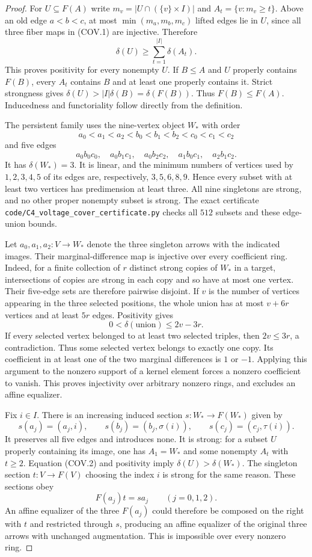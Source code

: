 \begin{proof}
For $U\subseteq F(A)$ write
$m_v=|U\cap(\{v\}\times I)|$ and
$A_t=\{v:m_v\geq t\}$. Above an old edge $a<b<c$, at
most $\min(m_a,m_b,m_c)$ lifted edges lie in $U$, since
all three fiber maps in (COV.1) are injective. Therefore
\[
 \delta(U)\geq \sum_{t=1}^{|I|}\delta(A_t).
 \tag{COV.2}
\]
This proves positivity for every nonempty $U$. If
$B\leq A$ and $U$ properly contains $F(B)$, every $A_t$
contains $B$ and at least one properly contains it.
Strict strongness gives
$\delta(U)>|I|\delta(B)=\delta(F(B))$.
Thus $F(B)\leq F(A)$. Inducedness and functoriality follow
directly from the definition.

The persistent family uses the nine-vertex object $W_*$
with order
\[
 a_0<a_1<a_2<b_0<b_1<b_2<c_0<c_1<c_2
\]
and five edges
\[
 a_0b_0c_0,\quad a_0b_1c_1,\quad a_0b_2c_2,
 \quad a_1b_0c_1,\quad a_2b_1c_2.
 \tag{COV.3}
\]
It has $\delta(W_*)=3$. It is linear, and the minimum
numbers of vertices used by $1,2,3,4,5$ of its edges are,
respectively, $3,5,6,8,9$. Hence every subset with at least
two vertices has predimension at least three. All nine
singletons are strong, and no other proper nonempty subset
is strong. The exact certificate
\texttt{code/C4\_voltage\_cover\_certificate.py}
checks all $512$ subsets and these edge-union bounds.

Let $a_0,a_1,a_2:V\to W_*$ denote the three singleton
arrows with the indicated images. Their marginal-difference
map is injective over every coefficient ring. Indeed, for
a finite collection of $r$ distinct strong copies of $W_*$
in a target, intersections of copies are strong in each
copy and so have at most one vertex. Their five-edge sets
are therefore pairwise disjoint. If $v$ is the number of
vertices appearing in the three selected positions, the
whole union has at most $v+6r$ vertices and at least $5r$
edges. Positivity gives
\[
 0<\delta(\text{union})\leq 2v-3r.
 \tag{COV.4}
\]
If every selected vertex belonged to at least two selected
triples, then $2v\leq3r$, a contradiction. Thus some selected
vertex belongs to exactly one copy. Its coefficient in at
least one of the two marginal differences is $1$ or $-1$.
Applying this argument to the nonzero support of a kernel
element forces a nonzero coefficient to vanish. This proves
injectivity over arbitrary nonzero rings, and excludes an
affine equalizer.

Fix $i\in I$. There is an increasing induced section
$s:W_*\to F(W_*)$ given by
\[
 s(a_j)=(a_j,i),\qquad s(b_j)=(b_j,\sigma(i)),
 \qquad s(c_j)=(c_j,\tau(i)).
 \tag{COV.5}
\]
It preserves all five edges and introduces none. It is
strong: for a subset $U$ properly containing its image,
one has $A_1=W_*$ and some nonempty $A_t$ with $t\geq2$.
Equation (COV.2) and positivity imply
$\delta(U)>\delta(W_*)$.
The singleton section $t:V\to F(V)$ choosing the index
$i$ is strong for the same reason. These sections obey
\[
 F(a_j)t=s a_j\qquad(j=0,1,2).
 \tag{COV.6}
\]
An affine equalizer of the three $F(a_j)$ could therefore
be composed on the right with $t$ and restricted through
$s$, producing an affine equalizer of the original three
arrows with unchanged augmentation. This is impossible
over every nonzero ring.


\end{proof}
